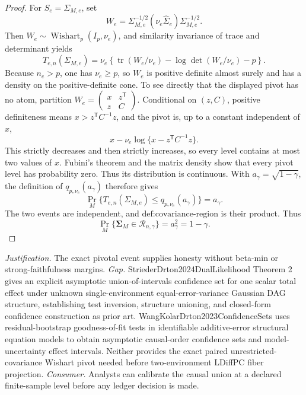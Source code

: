 \documentclass{article}
\begin{document}
\begin{proof}
For \(S_e=\Sigma_{M,e}\), set
\[
 W_e=\Sigma_{M,e}^{-1/2}(\nu_e\widehat\Sigma_e)
                 \Sigma_{M,e}^{-1/2}.
\]
Then \(W_e\sim\operatorname{Wishart}_p(I_p,\nu_e)\), and similarity invariance of trace and determinant yields
\[
 T_{e,n}(\Sigma_{M,e})
 =\nu_e\left\{\operatorname{tr}(W_e/\nu_e)
      -\log\det(W_e/\nu_e)-p\right\}.
\]
Because \(n_e>p\), one has \(\nu_e\ge p\), so \(W_e\) is positive definite almost surely and has a density on the positive-definite cone.  To see directly that the displayed pivot has no atom, partition \(W_e=\left(\begin{smallmatrix}x&z^{\mathsf T}\\z&C\end{smallmatrix}\right)\).  Conditional on \((z,C)\), positive definiteness means \(x>z^{\mathsf T}C^{-1}z\), and the pivot is, up to a constant independent of \(x\),
\[
 x-\nu_e\log\{x-z^{\mathsf T}C^{-1}z\}.
\]
This strictly decreases and then strictly increases, so every level contains at most two values of \(x\).  Fubini's theorem and the matrix density show that every pivot level has probability zero.  Thus its distribution is continuous.  With \(a_\gamma=\sqrt{1-\gamma}\), the definition of \(q_{p,\nu_e}(a_\gamma)\) therefore gives
\[
 \Pr_M\{T_{e,n}(\Sigma_{M,e})\le q_{p,\nu_e}(a_\gamma)\}=a_\gamma.
\]
The two events are independent, and \(\text{def:covariance-region}\) is their product.  Thus
\[
 \Pr_M\{\boldsymbol\Sigma_M\in\mathcal R_{n,\gamma}\}
 =a_\gamma^2=1-\gamma.
\]
\end{proof}
\par\smallskip\noindent \textit{Justification.} The exact pivotal event supplies honesty without beta-min or strong-faithfulness margins. \textit{Gap.} StriederDrton2024DualLikelihood Theorem 2 gives an explicit asymptotic union-of-intervals confidence set for one scalar total effect under unknown single-environment equal-error-variance Gaussian DAG structure, establishing test inversion, structure unioning, and closed-form confidence construction as prior art. WangKolarDrton2023ConfidenceSets uses residual-bootstrap goodness-of-fit tests in identifiable additive-error structural equation models to obtain asymptotic causal-order confidence sets and model-uncertainty effect intervals. Neither provides the exact paired unrestricted-covariance Wishart pivot needed before two-environment LDiffPC fiber projection. \textit{Consumer.} Analysts can calibrate the causal union at a declared finite-sample level before any ledger decision is made.
\end{document}
